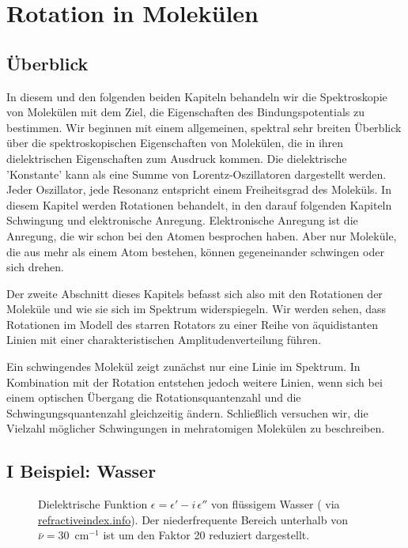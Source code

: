 \renewcommand{\lastmod}{10. Januar 2026}
\renewcommand{\chapterauthors}{Markus Lippitz}

\chapter{Rotation in Molekülen}



\section{Überblick}


In diesem und den folgenden beiden  Kapiteln behandeln wir die Spektroskopie von Molekülen mit dem Ziel, die Eigenschaften des Bindungspotentials zu bestimmen. Wir beginnen mit einem allgemeinen, spektral sehr breiten Überblick über die spektroskopischen Eigenschaften von Molekülen, die in ihren dielektrischen Eigenschaften zum Ausdruck kommen. Die dielektrische 'Konstante' kann als eine Summe von Lorentz-Oszillatoren dargestellt werden.  Jeder Oszillator, jede Resonanz entspricht einem Freiheitsgrad des Moleküls. In diesem Kapitel werden Rotationen behandelt, in den darauf folgenden  Kapiteln Schwingung und  elektronische Anregung. Elektronische Anregung ist die Anregung, die wir schon bei den Atomen besprochen haben. Aber nur Moleküle, die aus mehr als einem Atom bestehen, können gegeneinander schwingen oder sich drehen.

Der zweite Abschnitt dieses Kapitels befasst sich also mit den Rotationen der Moleküle und wie sie sich im Spektrum widerspiegeln. Wir werden sehen, dass Rotationen im Modell des starren Rotators zu einer Reihe von äquidistanten Linien mit einer charakteristischen Amplitudenverteilung führen.

Ein schwingendes Molekül zeigt zunächst nur eine Linie im Spektrum. In Kombination mit der Rotation entstehen jedoch weitere Linien, wenn sich bei einem optischen Übergang die Rotationsquantenzahl und die Schwingungsquantenzahl gleichzeitig ändern. Schließlich versuchen wir, die Vielzahl möglicher Schwingungen in mehratomigen Molekülen zu beschreiben.


\section{I Beispiel: Wasser}

\begin{figure}
\caption{Dielektrische Funktion $\epsilon = \epsilon' - i \, \epsilon''$ von flüssigem Wasser (\cite{Segelstein_water} via 
\href{https://refractiveindex.info/?shelf=main&book=H2O&page=Segelstein}{refractiveindex.info}). Der niederfrequente Bereich unterhalb von $\bar{\nu} = 30$~cm$^{-1}$ ist um den Faktor 20 reduziert dargestellt.
\label{fig:diel_water}}

\end{figure}


